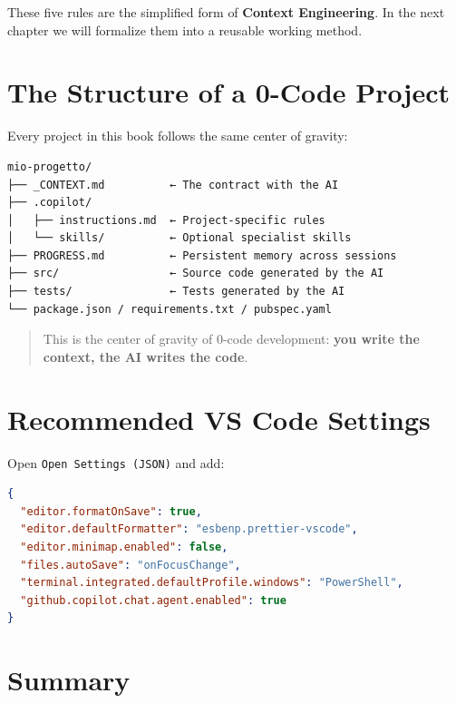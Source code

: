 \begin{notebox}
These five rules are the simplified form of \textbf{Context Engineering}. In the next chapter we will formalize them into a reusable working method.
\end{notebox}

\section{The Structure of a 0-Code Project}

Every project in this book follows the same center of gravity:

\begin{lstlisting}[language={}]
mio-progetto/
├── _CONTEXT.md          ← The contract with the AI
├── .copilot/
│   ├── instructions.md  ← Project-specific rules
│   └── skills/          ← Optional specialist skills
├── PROGRESS.md          ← Persistent memory across sessions
├── src/                 ← Source code generated by the AI
├── tests/               ← Tests generated by the AI
└── package.json / requirements.txt / pubspec.yaml
\end{lstlisting}

\begin{quote}
This is the center of gravity of 0-code development: \textbf{you write the context, the AI writes the code}.
\end{quote}

\section{Recommended VS Code Settings}

\begin{praticabox}[title={Hands-on --- Recommended settings}]
Open \texttt{Open Settings (JSON)} and add:
\begin{lstlisting}[language=json]
{
  "editor.formatOnSave": true,
  "editor.defaultFormatter": "esbenp.prettier-vscode",
  "editor.minimap.enabled": false,
  "files.autoSave": "onFocusChange",
  "terminal.integrated.defaultProfile.windows": "PowerShell",
  "github.copilot.chat.agent.enabled": true
}
\end{lstlisting}
\end{praticabox}

\section*{Summary}

